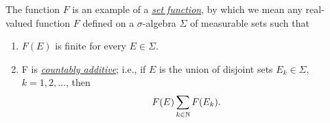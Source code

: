 The function $F$ is an example of a
\href{https://en.wikipedia.org/wiki/Set_function}{\emph{set function}}, by
which we mean any real-valued function $F$ defined on a $\sigma$-algebra
$\Sigma$ of measurable sets such that
\begin{enumerate}[label=(\roman*),noitemsep]
\item $F(E)$ is finite for every $E\in\Sigma$.
\item F is
  \href{https://en.wikipedia.org/wiki/Measure_(mathematics)#Properties}{\emph{countably
      additive}}; i.e., if $E$ is the union of disjoint sets
  $E_k\in\Sigma$, $k=1,2,\dotsc$, then
  \begin{equation}
    \label{eq:3:countably-additive-set-function}
    F(E)\sum_{k\in\mathbb{N}} F(E_k).
  \end{equation}
\end{enumerate}

